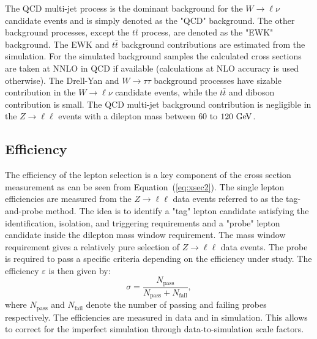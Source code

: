 The QCD multi-jet process is the dominant background for the $W \rightarrow \ell\nu$ candidate events and is simply denoted as the "QCD" background.  The other background processes, except the $t\bar{t}$ process, are denoted as the "EWK" background. The EWK and $t\bar{t}$ background contributions are estimated from the simulation. For the simulated background samples the calculated cross sections are taken at NNLO in QCD if available (calculations at NLO accuracy is used otherwise). The  Drell-Yan and $W\rightarrow \tau\tau$ background processes have sizable contribution in the $W \rightarrow \ell\nu$ candidate events, while the $t\bar{t}$ and diboson contribution is small. The QCD multi-jet background contribution is negligible in the $Z \rightarrow \ell\ell$ events with a dilepton mass between $60$ to $120~\mathrm{Ge\kern -0.1em V}$.    

\subsection{Efficiency}

The efficiency of the lepton selection is a key component of the cross section measurement as can be seen from Equation~(\ref{eq:xsec2}). The single lepton efficiencies are measured from the $Z \rightarrow \ell\ell$ data events referred to as the tag-and-probe method. The idea is to identify a "tag" lepton candidate satisfying the identification, isolation, and triggering requirements and a "probe" lepton candidate inside the dilepton mass window requirement. The mass window requirement gives a relatively pure selection of  $Z \rightarrow \ell\ell$ data events. The probe is required to pass a specific criteria depending on the efficiency under study. The efficiency $\varepsilon$ is then given by:
\begin{equation} \label{eq:eff}
\sigma = \frac{N_{\mathrm{pass}}}{N_{\mathrm{pass}}+N_{\mathrm{fail}}},
\end{equation}
where $N_{\mathrm{pass}}$ and $N_{\mathrm{fail}}$ denote the number of passing and failing probes respectively. The efficiencies are measured in data and in simulation. This allows to correct for the imperfect simulation through data-to-simulation scale factors.   

